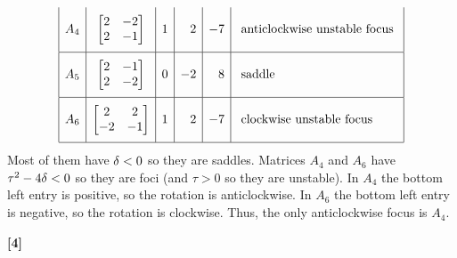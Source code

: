 \documentclass[a4paper]{article}
\newcounter{probcounter}
\newcounter{marksawarded}
\newcommand{\mks}[1]{%
\addtocounter{marksawarded}{#1}%
\textbf{\color{red}[#1]}}
\newenvironment{solution}{\comment}{\endcomment}
\newenvironment{solution}{
{\bigskip\par\noindent \bf Solution:}}{
\newpage
\typeout{Q\arabic{probcounter}: \arabic{marksawarded} marks awarded}
}
\begin{document}
\begin{solution}
\begin{itemize}
\[\begin{array}{|r|c|r|r|r|l|}
       \VP A_4 & \bbm  2 &-2 \\ 2 & -1 \ebm &  1 &  2 & -7 & \text{ anticlockwise unstable focus } \\ \hline
       \VP A_5 & \bbm  2 &-1 \\ 2 & -2 \ebm &  0 & -2 &  8 & \text{ saddle } \\ \hline
       \VP A_6 & \bbm  2 & 2 \\-2 & -1 \ebm &  1 &  2 & -7 & \text{ clockwise unstable focus } \\ \hline
      \end{array}
   \]
   Most of them have $\delta<0$ so they are saddles.  Matrices $A_4$ and
   $A_6$ have $\tau^2-4\delta<0$ so they are foci (and $\tau>0$ so they
   are unstable).  In $A_4$ the bottom left entry is positive, so the
   rotation is anticlockwise.  In $A_6$ the bottom left entry is
   negative, so the rotation is clockwise.  Thus, the only
   anticlockwise focus is $A_4$.\mks{4}
 \end{itemize}
\end{solution}
\end{document}

